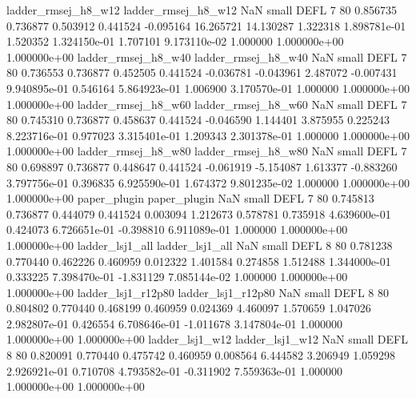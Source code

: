      ladder_rmsej_h8_w12      ladder_rmsej_h8_w12                   NaN      small     DEFL                 7 80 0.856735       0.736877 0.503912       0.441524   -0.095164     16.265721     14.130287     1.322318   1.898781e-01  1.520352 1.324150e-01     1.707101   9.173110e-02            1.000000    1.000000e+00        1.000000e+00
     ladder_rmsej_h8_w40      ladder_rmsej_h8_w40                   NaN      small     DEFL                 7 80 0.736553       0.736877 0.452505       0.441524   -0.036781     -0.043961      2.487072    -0.007431   9.940895e-01  0.546164 5.864923e-01     1.006900   3.170570e-01            1.000000    1.000000e+00        1.000000e+00
     ladder_rmsej_h8_w60      ladder_rmsej_h8_w60                   NaN      small     DEFL                 7 80 0.745310       0.736877 0.458637       0.441524   -0.046590      1.144401      3.875955     0.225243   8.223716e-01  0.977023 3.315401e-01     1.209343   2.301378e-01            1.000000    1.000000e+00        1.000000e+00
     ladder_rmsej_h8_w80      ladder_rmsej_h8_w80                   NaN      small     DEFL                 7 80 0.698897       0.736877 0.448647       0.441524   -0.061919     -5.154087      1.613377    -0.883260   3.797756e-01  0.396835 6.925590e-01     1.674372   9.801235e-02            1.000000    1.000000e+00        1.000000e+00
            paper_plugin             paper_plugin                   NaN      small     DEFL                 7 80 0.745813       0.736877 0.444079       0.441524    0.003094      1.212673      0.578781     0.735918   4.639600e-01  0.424073 6.726651e-01    -0.398810   6.911089e-01            1.000000    1.000000e+00        1.000000e+00
         ladder_lsj1_all          ladder_lsj1_all                   NaN      small     DEFL                 8 80 0.781238       0.770440 0.462226       0.460959    0.012322      1.401584      0.274858     1.512488   1.344000e-01  0.333225 7.398470e-01    -1.831129   7.085144e-02            1.000000    1.000000e+00        1.000000e+00
      ladder_lsj1_r12p80       ladder_lsj1_r12p80                   NaN      small     DEFL                 8 80 0.804802       0.770440 0.468199       0.460959    0.024369      4.460097      1.570659     1.047026   2.982807e-01  0.426554 6.708646e-01    -1.011678   3.147804e-01            1.000000    1.000000e+00        1.000000e+00
         ladder_lsj1_w12          ladder_lsj1_w12                   NaN      small     DEFL                 8 80 0.820091       0.770440 0.475742       0.460959    0.008564      6.444582      3.206949     1.059298   2.926921e-01  0.710708 4.793582e-01    -0.311902   7.559363e-01            1.000000    1.000000e+00        1.000000e+00
